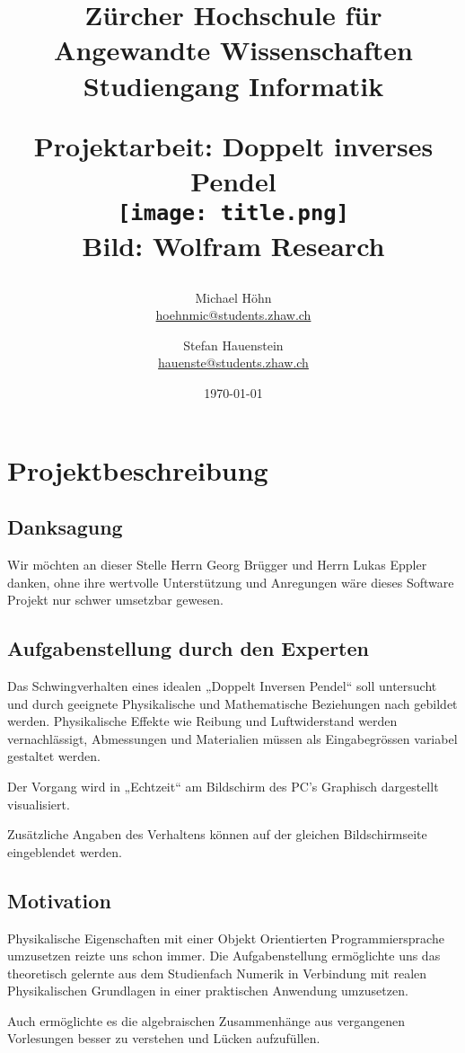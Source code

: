 \documentclass[12pt]{article}
\title{\vspace{-1cm}\linespread{1}\begin{flushleft}\normalsize{Zürcher Hochschule für Angewandte Wissenschaften\\Studiengang Informatik\\}\end{flushleft}\vspace{2cm}\Large{Projektarbeit: Doppelt inverses Pendel}\\\vspace{2cm} \texttt{[image: title.png]} \\ \tiny{Bild: Wolfram Research}}
\author{Michael Höhn\\\href{mailto:hoehnmic@students.zhaw.ch}{hoehnmic@students.zhaw.ch} \and Stefan Hauenstein\\\href{mailto:hauenste@students.zhaw.ch}{hauenste@students.zhaw.ch}}
\date{\today}
\numberwithin{equation}{subsection}
\begin{document}
\maketitle\thispagestyle{empty}
\newpage

\tableofcontents
\newpage

\section{Projektbeschreibung}
\subsection{Danksagung}
Wir möchten an dieser Stelle Herrn Georg Brügger und Herrn Lukas Eppler danken, ohne ihre wertvolle Unterstützung und Anregungen wäre dieses Software Projekt nur schwer umsetzbar gewesen.

\subsection{Aufgabenstellung durch den Experten}
Das Schwingverhalten eines idealen „Doppelt Inversen Pendel“ soll untersucht und durch geeignete Physikalische und Mathematische Beziehungen nach gebildet werden. Physikalische Effekte wie Reibung und Luftwiderstand werden vernachlässigt, Abmessungen und Materialien müssen als Eingabegrössen variabel gestaltet werden.

Der Vorgang wird in „Echtzeit“ am Bildschirm des PC's Graphisch dargestellt visualisiert.

Zusätzliche Angaben des Verhaltens können auf der gleichen Bildschirmseite eingeblendet werden.

\subsection{Motivation}
Physikalische Eigenschaften mit einer Objekt Orientierten Programmiersprache umzusetzen reizte uns schon immer. Die  Aufgabenstellung ermöglichte uns das theoretisch gelernte aus dem Studienfach Numerik in Verbindung mit realen Physikalischen Grundlagen in einer praktischen Anwendung umzusetzen.

Auch ermöglichte es die algebraischen Zusammenhänge aus vergangenen Vorlesungen besser zu verstehen und Lücken aufzufüllen.
\end{document}
